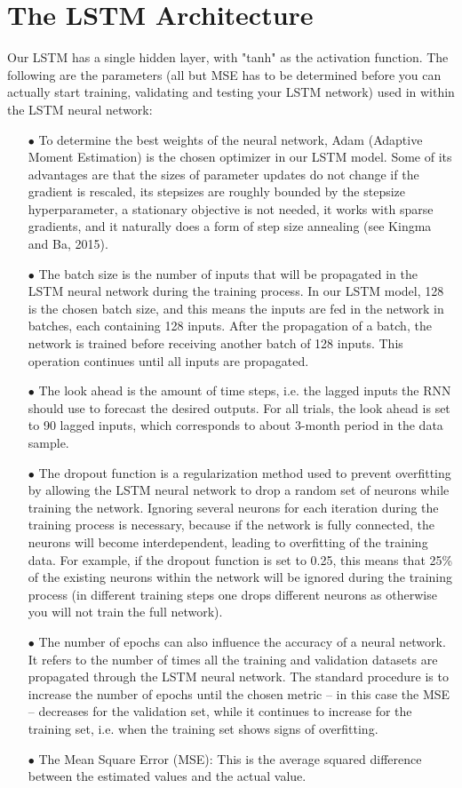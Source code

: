 \documentclass[a4paper,11pt,oneside]{book}
\begin{document}
\section{The LSTM Architecture}
Our LSTM has a single hidden layer,  with "tanh" as the activation function. The following are the parameters (all but MSE has to be determined before you can actually start training, validating and testing your LSTM network) used in within the LSTM neural network:
\begin{itemize}

\item[$\bullet$]   
To determine the best weights of the neural network, Adam (Adaptive Moment Estimation) is the chosen optimizer in our LSTM model. Some of its advantages are that the sizes of parameter updates do not change if the gradient is rescaled, its stepsizes are roughly bounded by the stepsize hyperparameter, a stationary objective is not needed, it works with sparse gradients, and it naturally does a
form of step size annealing (see Kingma and Ba, 2015).
\item[$\bullet$] The batch size is the number of inputs that will be propagated in the
LSTM neural network during the training process. In our LSTM model, 128 is the chosen batch size, and this means the inputs are
fed in the network in batches, each containing 128 inputs. After
the propagation of a batch, the network is trained before receiving another
batch of 128 inputs. This operation continues until all inputs are propagated.
\item[$\bullet$] The look ahead is the amount of time steps, i.e. the lagged
inputs the RNN should use to forecast the desired outputs. For all trials, the look ahead is set to 90 lagged inputs, which
corresponds to about 3-month period in the data sample.
\item[$\bullet$] The dropout function is a regularization method used to prevent overfitting by
allowing the LSTM neural network to drop a random set of neurons while
training the network. Ignoring several neurons for each iteration during the
training process is necessary, because if the network is fully connected, the
neurons will become interdependent, leading to overfitting of the training data. For example, if the dropout function is set to 0.25, this means that 25\% of the existing
neurons within the network will be ignored during the training process (in different training steps one drops different neurons as otherwise you will not train the full network).
\item[$\bullet$] The number of epochs can also influence the accuracy of a neural network. It
refers to the number of times all the training and validation datasets are
propagated through the LSTM neural network. The standard procedure is to
increase the number of epochs until the chosen metric – in this case the MSE
– decreases for the validation set, while it continues to increase for the training
set, i.e. when the training set shows signs of overfitting.
\item[$\bullet$] The Mean Square Error (MSE): This is the average squared difference between the estimated values and the actual value.
\end{itemize}
\end{document}
